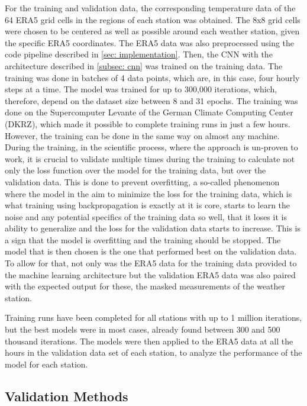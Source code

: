 For the training and validation data, the corresponding temperature data of the 64 ERA5 grid cells in the regions of each station was obtained.
The 8x8 grid cells were chosen to be centered as well as possible around each weather station, given the specific ERA5 coordinates.
The ERA5 data was also preprocessed using the code pipeline described in \autoref{sec: implementation}.
Then, the CNN with the architecture described in \autoref{subsec: cnn} was trained on the training data.
The training was done in batches of 4 data points, which are, in this case, four hourly steps at a time.
The model was trained for up to 300,000 iterations, which, therefore, depend on the dataset size between 8 and 31 epochs. The training was done on the Supercomputer Levante of the German Climate Computing Center (DKRZ), which made it possible to complete training runs in just a few hours.
However, the training can be done in the same way on almost any machine.
During the training, in the scientific process, where the approach is un-proven to work, it is crucial to validate multiple times during the training to calculate not only the loss function over the model for the training data, but over the validation data.
This is done to prevent overfitting, a so-called phenomenon where the model in the aim to minimize the loss for the training data, which is what training using backpropagation is exactly at it is core, starts to learn the noise and any potential specifics of the training data so well, that it loses it is ability to generalize and the loss for the validation data starts to increase.
This is a sign that the model is overfitting and the training should be stopped. The model that is then chosen is the one that performed best on the validation data.
To allow for that, not only was the ERA5 data for the training data provided to the machine learning architecture but the validation ERA5 data was also paired with the expected output for these, the masked measurements of the weather station.

Training runs have been completed for all stations with up to 1 million iterations, but the best models were in most cases, already found between 300 and 500 thousand iterations.
The models were then applied to the ERA5 data at all the hours in the validation data set of each station, to analyze the performance of the model for each station. 

\subsection{Validation Methods}

